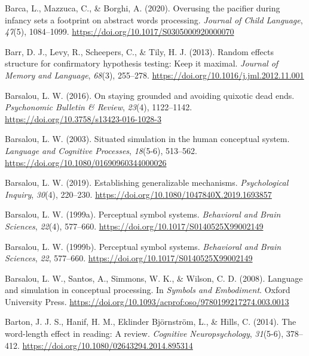 \documentclass[
  12pt,
  man,floatsintext]{apa7}
\newlength{\cslhangindent}
\newlength{\cslentryspacingunit} %
\newenvironment{CSLReferences}[2] %
 {%
  \setlength{\parindent}{0pt}
  \ifodd #1
  \let\oldpar\par
  \def\par{\hangindent=\cslhangindent\oldpar}
  \fi
  \setlength{\parskip}{#2\cslentryspacingunit}
 }%
 {}
\begin{document}
\begin{CSLReferences}{1}{0}
\leavevmode{}%
Barca, L., Mazzuca, C., \& Borghi, A. (2020). Overusing the pacifier during infancy sets a footprint on abstract words processing. \emph{Journal of Child Language}, \emph{47}(5), 1084--1099. \url{https://doi.org/10.1017/S0305000920000070}

\leavevmode{}%
Barr, D. J., Levy, R., Scheepers, C., \& Tily, H. J. (2013). Random effects structure for confirmatory hypothesis testing: {Keep} it maximal. \emph{Journal of Memory and Language}, \emph{68}(3), 255--278. \url{https://doi.org/10.1016/j.jml.2012.11.001}

\leavevmode{}%
Barsalou, L. W. (2016). On staying grounded and avoiding quixotic dead ends. \emph{Psychonomic Bulletin \& Review}, \emph{23}(4), 1122--1142. \url{https://doi.org/10.3758/s13423-016-1028-3}

\leavevmode{}%
Barsalou, L. W. (2003). Situated simulation in the human conceptual system. \emph{Language and Cognitive Processes}, \emph{18}(5-6), 513--562. \url{https://doi.org/10.1080/01690960344000026}

\leavevmode{}%
Barsalou, L. W. (2019). Establishing generalizable mechanisms. \emph{Psychological Inquiry}, \emph{30}(4), 220--230. \url{https://doi.org/10.1080/1047840X.2019.1693857}

\leavevmode{}%
Barsalou, L. W. (1999a). Perceptual symbol systems. \emph{Behavioral and Brain Sciences}, \emph{22}(4), 577--660. \url{https://doi.org/10.1017/S0140525X99002149}

\leavevmode{}%
Barsalou, L. W. (1999b). Perceptual symbol systems. \emph{Behavioral and Brain Sciences}, \emph{22}, 577--660. \url{https://doi.org/10.1017/S0140525X99002149}

\leavevmode{}%
Barsalou, L. W., Santos, A., Simmons, W. K., \& Wilson, C. D. (2008). Language and simulation in conceptual processing. In \emph{Symbols and {Embodiment}}. {Oxford University Press}. \url{https://doi.org/10.1093/acprof:oso/9780199217274.003.0013}

\leavevmode{}%
Barton, J. J. S., Hanif, H. M., Eklinder Björnström, L., \& Hills, C. (2014). The word-length effect in reading: {A} review. \emph{Cognitive Neuropsychology}, \emph{31}(5-6), 378--412. \url{https://doi.org/10.1080/02643294.2014.895314}


\end{CSLReferences}
\end{document}
